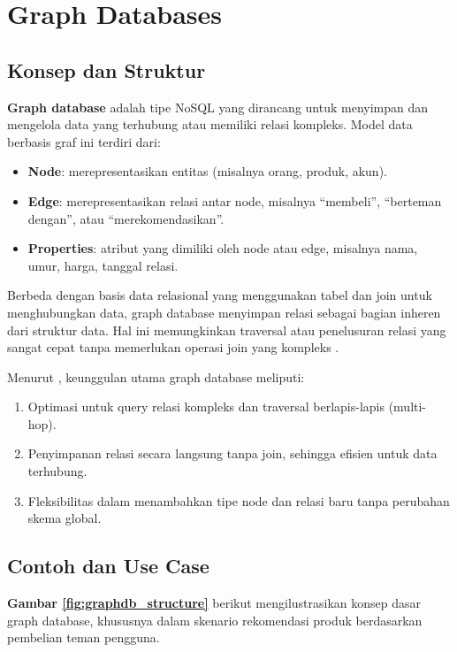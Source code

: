 \section{Graph Databases}

\subsection{Konsep dan Struktur}

\textbf{Graph database} adalah tipe NoSQL yang dirancang untuk menyimpan dan mengelola data yang terhubung atau memiliki relasi kompleks. Model data berbasis graf ini terdiri dari:
\begin{itemize}
	\item \textbf{Node}: merepresentasikan entitas (misalnya orang, produk, akun).
	\item \textbf{Edge}: merepresentasikan relasi antar node, misalnya “membeli”, “berteman dengan”, atau “merekomendasikan”.
	\item \textbf{Properties}: atribut yang dimiliki oleh node atau edge, misalnya nama, umur, harga, tanggal relasi.
\end{itemize}

Berbeda dengan basis data relasional yang menggunakan tabel dan join untuk menghubungkan data, graph database menyimpan relasi sebagai bagian inheren dari struktur data. Hal ini memungkinkan traversal atau penelusuran relasi yang sangat cepat tanpa memerlukan operasi join yang kompleks \cite{moniruzzaman2013nosql, han2011survey}. 

Menurut \cite{moniruzzaman2013nosql}, keunggulan utama graph database meliputi:
\begin{enumerate}
	\item Optimasi untuk query relasi kompleks dan traversal berlapis-lapis (multi-hop).
	\item Penyimpanan relasi secara langsung tanpa join, sehingga efisien untuk data terhubung.
	\item Fleksibilitas dalam menambahkan tipe node dan relasi baru tanpa perubahan skema global.
\end{enumerate}

\subsection{Contoh dan Use Case}


\textbf{Gambar \ref{fig:graphdb_structure}} berikut mengilustrasikan konsep dasar graph database, khususnya dalam skenario rekomendasi produk berdasarkan pembelian teman pengguna.

